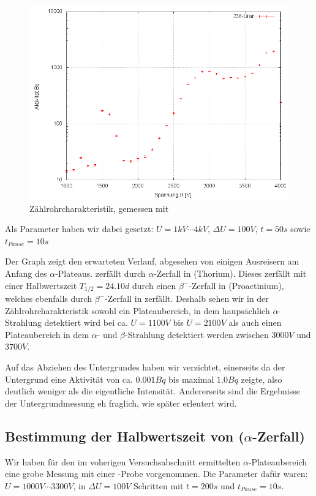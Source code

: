 \begin{figure}[H]
 \centering \includegraphics[width=0.9\linewidth]{Messwerte/plots/U238.png}
 \caption{Zählrohrcharakteristik, gemessen mit }
\end{figure}
Als Parameter haben wir dabei gesetzt: $U = 1kV \cdots 4kV$, $\Delta U = 100 V$, $t = 50s$ sowie $t_{Pause} = 10s$

Der Graph zeigt den erwarteten Verlauf, abgesehen von einigen Ausreisern am Anfang des $\alpha$-Plateaus.  zerfällt durch $\alpha$-Zerfall in  (Thorium). Dieses zerfällt mit einer Halbwertszeit $T_{1/2} = 24.10d$ durch einen $\beta^-$-Zerfall in  (Proactinium), welches ebenfalls durch $\beta^-$-Zerfall in  zerfällt. Deshalb sehen wir in der Zählrohrcharakteristik sowohl ein Plateaubereich, in dem haupsächlich $\alpha$-Strahlung detektiert wird bei ca. $U = 1100V$ bis $U = 2100V$ als auch einen Plateaubereich in dem $\alpha$- und $\beta$-Strahlung detektiert werden zwischen $3000V$ und $3700V$.

Auf das Abziehen des Untergrundes haben wir verzichtet, einerseits da der Untergrund eine Aktivität von ca. $0.001Bq$ bis maximal $1.0Bq$ zeigte, also deutlich weniger als die eigentliche Intensität. Andererseits sind die Ergebnisse der Untergrundmessung eh fraglich, wie später erleutert wird.

\subsection{Bestimmung der Halbwertszeit von  ($\alpha$-Zerfall)}

Wir haben für den im voherigen Versuchsabschnitt ermittelten $\alpha$-Plateaubereich eine grobe Messung mit einer -Probe vorgenommen. Die Parameter dafür waren: $U= 1000V \cdots 3300V$, in $\Delta U = 100 V$ Schritten mit $t=200s$ und $t_{Pause} = 10s$.

